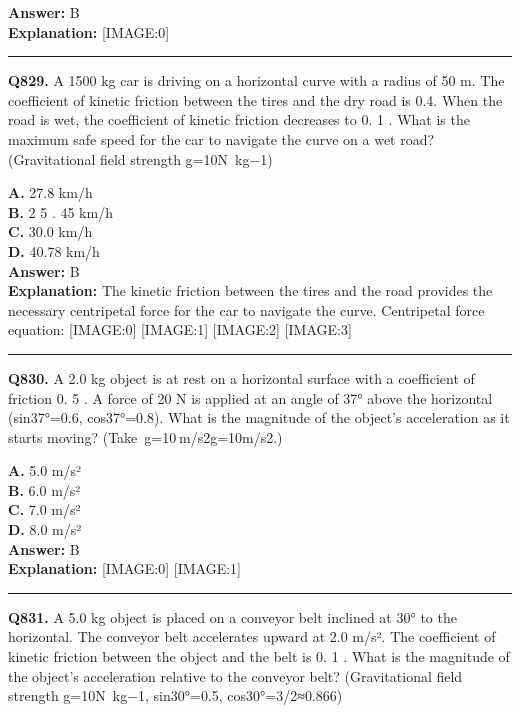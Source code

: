 \documentclass[12pt]{article}
\begin{document}
\textbf{Answer:} B \\
\textbf{Explanation:} [IMAGE:0]

\hrule
\vspace{1em}


\noindent
\textbf{Q829.} A 1500 kg car is driving on a horizontal curve with a radius of 50 m. The coefficient of kinetic friction between the tires and the dry road is 0.4. When the road is wet, the coefficient of kinetic friction decreases to 0.
1
. What is the maximum safe speed for the car to navigate the curve on a wet road? (Gravitational field strength g=10N kg−1)



\textbf{A.} 27.8 km/h \\
\textbf{B.} 2
5
.
45
km/h \\
\textbf{C.} 30.0 km/h \\
\textbf{D.} 40.78 km/h \\

\textbf{Answer:} B \\
\textbf{Explanation:} The kinetic friction between the tires and the road provides the necessary centripetal force for the car to navigate the curve.
Centripetal force equation:
[IMAGE:0]
[IMAGE:1]
[IMAGE:2]
[IMAGE:3]

\hrule
\vspace{1em}


\noindent
\textbf{Q830.} A 2.0 kg object is at rest on a horizontal surface with a coefficient of friction 0.
5
. A force of 20 N is applied at an angle of 37° above the horizontal (sin37°=0.6, cos37°=0.8). What is the magnitude of the object’s acceleration as it starts moving? (Take g=10 m/s2g=10m/s2.)



\textbf{A.} 5.0 m/s² \\
\textbf{B.} 6.0 m/s² \\
\textbf{C.} 7.0 m/s² \\
\textbf{D.} 8.0 m/s² \\

\textbf{Answer:} B \\
\textbf{Explanation:} [IMAGE:0]
[IMAGE:1]

\hrule
\vspace{1em}


\noindent
\textbf{Q831.} A 5.0 kg object is placed on a conveyor belt inclined at 30° to the horizontal. The conveyor belt accelerates upward at 2.0 m/s². The coefficient of kinetic friction between the object and the belt is 0.
1
. What is the magnitude of the object's acceleration relative to the conveyor belt? (Gravitational field strength g=10N kg−1, sin30°=0.5, cos30°=3​/2≈0.866)
\end{document}

